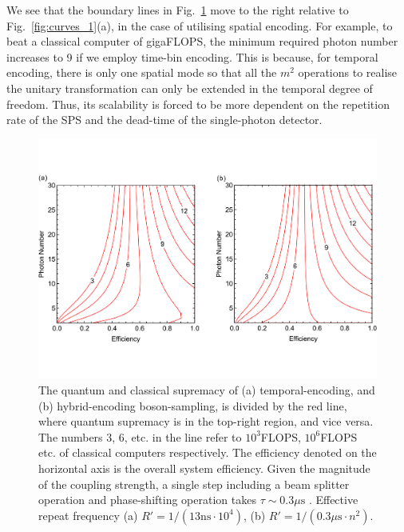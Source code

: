 \documentclass[aps,rmp,twocolumn,amsmath,amssymb,nofootinbib,superscriptaddress]{revtex4}
\newcommand{\comment}[1]{{\color{blue}{#1}}}
\begin{document}
We see that the boundary lines in Fig.~\ref{fig:curves_2} move to the right relative to Fig.~\ref{fig:curves_1}(a), in the case of utilising spatial encoding. For example, to beat a classical computer of gigaFLOPS, the minimum required photon number increases to 9 if we employ time-bin encoding. This is because, for temporal encoding, there is only one spatial mode so that all the $m^2$ operations to realise the unitary transformation can only be extended in the temporal degree of freedom. Thus, its scalability is forced to be more dependent on the repetition rate of the SPS and the dead-time of the single-photon detector.

\begin{figure}[!htb]
\includegraphics[width=\columnwidth]{curves_2}
\caption{The quantum and classical supremacy of (a) temporal-encoding, and (b) hybrid-encoding boson-sampling, is divided by the red line, where quantum supremacy is in the top-right region, and vice versa. The numbers 3, 6, etc. in the line refer to $10^3$FLOPS, $10^6$FLOPS etc. of classical computers respectively. The efficiency denoted on the horizontal axis is the overall system efficiency. Given the magnitude of the coupling strength, a single step including a beam splitter operation and phase-shifting operation takes \mbox{$\tau\sim0.3\mu\mathrm{s}$} \cite{bib:20}. Effective repeat frequency (a) \mbox{$R'=1/(13\mathrm{ns}\cdot 10^4)$}, (b) \mbox{$R'=1/(0.3\mu\mathrm{s}\cdot n^2).$} \comment{Why aren't the curves monotonic?! It's very strange that the curves change direction as photon-number increases??}} \label{fig:curves_2}
\end{figure}
\end{document}

